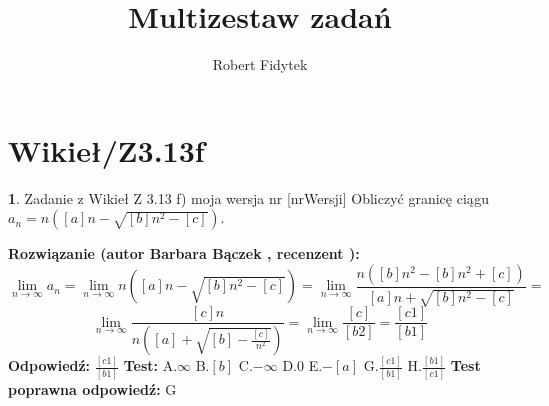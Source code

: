 \documentclass[12pt, a4paper]{article}
\title{Multizestaw zadań}
\author{Robert Fidytek}
\date{}
\theoremstyle{definition} %
\newtheorem{zad}{}
\newcommand{\kategoria}[1]{\section{#1}} %
\newcommand{\zadStart}[1]{\begin{zad}#1\newline} %
\newcommand{\zadStop}{\end{zad}}   %
\newcommand{\rozwStart}[2]{\noindent \textbf{Rozwiązanie (autor #1 , recenzent #2): }\newline} %
\newcommand{\rozwStop}{\newline}                                            %
\newcommand{\odpStart}{\noindent \textbf{Odpowiedź:}\newline}    %
\newcommand{\odpStop}{\newline}                                             %
\newcommand{\testStart}{\noindent \textbf{Test:}\newline} %
\newcommand{\testStop}{\newline} %
\newcommand{\kluczStart}{\noindent \textbf{Test poprawna odpowiedź:}\newline} %
\newcommand{\kluczStop}{\newline} %
\begin{document}
\maketitle


\kategoria{Wikieł/Z3.13f}
\zadStart{Zadanie z Wikieł Z 3.13 f) moja wersja nr [nrWersji]}
Obliczyć granicę ciągu $a_n= n([a]n-\sqrt{[b]n^2-[c]})$.
\zadStop
\rozwStart{Barbara Bączek}{}
$$\lim_{n \rightarrow \infty} a_n= \lim_{n \rightarrow \infty} n([a]n-\sqrt{[b]n^2-[c]})= \lim_{n \rightarrow \infty} \frac{n([b]n^2 -[b]n^2 +[c])}{[a]n+\sqrt{[b]n^2-[c]}}=$$
$$\lim_{n \rightarrow \infty} \frac{[c]n}{n([a]+\sqrt{[b]-\frac{[c]}{n^2}})}=  \lim_{n \rightarrow \infty} \frac{[c]}{[b2]}= \frac{[c1]}{[b1]}$$
\rozwStop
\odpStart
$\frac{[c1]}{[b1]}$
\odpStop
\testStart
A.$\infty$
B.$[b]$
C.$-\infty$
D.$0$
E.$-[a]$
G.$\frac{[c1]}{[b1]}$
H.$\frac{[b1]}{[c1]}$
\testStop
\kluczStart
G
\kluczStop
\end{document}
